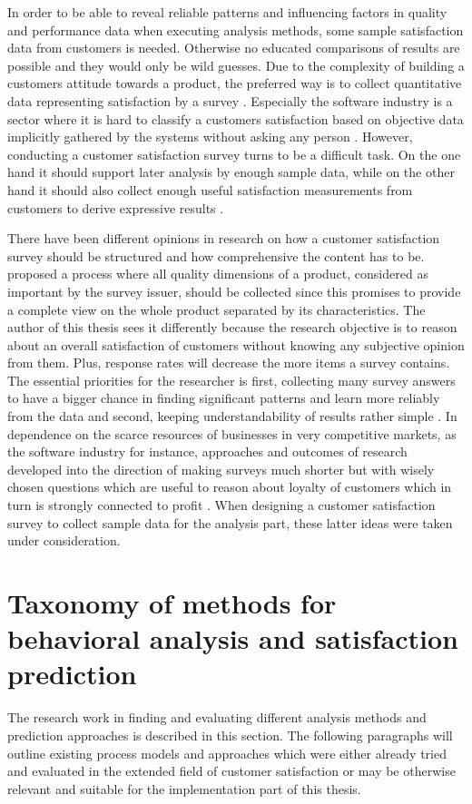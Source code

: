 In order to be able to reveal reliable patterns and influencing factors in quality and performance data when executing analysis methods, some sample satisfaction data from customers is needed. Otherwise no educated comparisons of results are possible and they would only be wild guesses. Due to the complexity of building a customers attitude towards a product, the preferred way is to collect quantitative data representing satisfaction by a survey \cite{yuksel1998customer} \cite{hayes1998measuring}. Especially the software industry is a sector where it is hard to classify a customers satisfaction based on objective data implicitly gathered by the systems without asking any person \cite{hayes1998measuring}. However, conducting a customer satisfaction survey turns to be a difficult task. On the one hand it should support later analysis by enough sample data, while on the other hand it should also collect enough useful satisfaction measurements from customers to derive expressive results \cite{sauermann2013increasing}. 

There have been different opinions in research on how a customer satisfaction survey should be structured and how comprehensive the content has to be. \cite{hayes1998measuring} proposed a process where all quality dimensions of a product, considered as important by the survey issuer, should be collected since this promises to provide a complete view on the whole product separated by its characteristics. The author of this thesis sees it differently because the research objective is to reason about an overall satisfaction of customers without knowing any subjective opinion from them. Plus, response rates will decrease the more items a survey contains. The essential priorities for the researcher is first, collecting many survey answers to have a bigger chance in finding significant patterns and learn more reliably from the data and second, keeping understandability of results rather simple \cite{sauermann2013increasing}. In dependence on the scarce resources of businesses in very competitive markets, as the software industry for instance, approaches and outcomes of research developed into the direction of making surveys much shorter but with wisely chosen questions which are useful to reason about loyalty of customers which in turn is strongly connected to profit \cite{reichheld2003one}. When designing a customer satisfaction survey to collect sample data for the analysis part, these latter ideas were taken under consideration. 

\section{Taxonomy of methods for behavioral analysis and satisfaction prediction}
The research work in finding and evaluating different analysis methods and prediction approaches is described in this section. The following paragraphs will outline existing process models and approaches which were either already tried and evaluated in the extended field of customer satisfaction or may be otherwise relevant and suitable for the implementation part of this thesis. 

